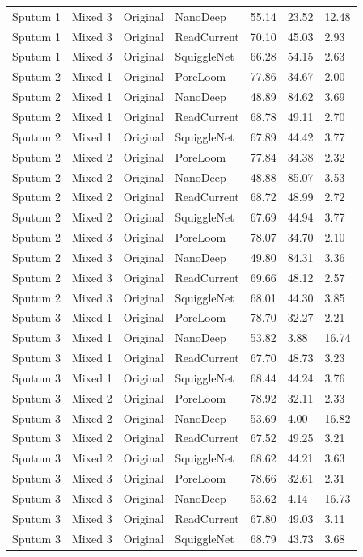 \begin{longtable}{lllllll}
Sputum 1 & Mixed 3 & Original & NanoDeep & 55.14 & 23.52 & 12.48\\
Sputum 1 & Mixed 3 & Original & ReadCurrent & 70.10 & 45.03 & 2.93\\
Sputum 1 & Mixed 3 & Original & SquiggleNet & 66.28 & 54.15 & 2.63\\
Sputum 2 & Mixed 1 & Original & PoreLoom & 77.86 & 34.67 & 2.00\\
Sputum 2 & Mixed 1 & Original & NanoDeep & 48.89 & 84.62 & 3.69\\
Sputum 2 & Mixed 1 & Original & ReadCurrent & 68.78 & 49.11 & 2.70\\
Sputum 2 & Mixed 1 & Original & SquiggleNet & 67.89 & 44.42 & 3.77\\
Sputum 2 & Mixed 2 & Original & PoreLoom & 77.84 & 34.38 & 2.32\\
Sputum 2 & Mixed 2 & Original & NanoDeep & 48.88 & 85.07 & 3.53\\
Sputum 2 & Mixed 2 & Original & ReadCurrent & 68.72 & 48.99 & 2.72\\
Sputum 2 & Mixed 2 & Original & SquiggleNet & 67.69 & 44.94 & 3.77\\
Sputum 2 & Mixed 3 & Original & PoreLoom & 78.07 & 34.70 & 2.10\\
Sputum 2 & Mixed 3 & Original & NanoDeep & 49.80 & 84.31 & 3.36\\
Sputum 2 & Mixed 3 & Original & ReadCurrent & 69.66 & 48.12 & 2.57\\
Sputum 2 & Mixed 3 & Original & SquiggleNet & 68.01 & 44.30 & 3.85\\
Sputum 3 & Mixed 1 & Original & PoreLoom & 78.70 & 32.27 & 2.21\\
Sputum 3 & Mixed 1 & Original & NanoDeep & 53.82 & 3.88 & 16.74\\
Sputum 3 & Mixed 1 & Original & ReadCurrent & 67.70 & 48.73 & 3.23\\
Sputum 3 & Mixed 1 & Original & SquiggleNet & 68.44 & 44.24 & 3.76\\
Sputum 3 & Mixed 2 & Original & PoreLoom & 78.92 & 32.11 & 2.33\\
Sputum 3 & Mixed 2 & Original & NanoDeep & 53.69 & 4.00 & 16.82\\
Sputum 3 & Mixed 2 & Original & ReadCurrent & 67.52 & 49.25 & 3.21\\
Sputum 3 & Mixed 2 & Original & SquiggleNet & 68.62 & 44.21 & 3.63\\
Sputum 3 & Mixed 3 & Original & PoreLoom & 78.66 & 32.61 & 2.31\\
Sputum 3 & Mixed 3 & Original & NanoDeep & 53.62 & 4.14 & 16.73\\
Sputum 3 & Mixed 3 & Original & ReadCurrent & 67.80 & 49.03 & 3.11\\
Sputum 3 & Mixed 3 & Original & SquiggleNet & 68.79 & 43.73 & 3.68\\
\end{longtable}

